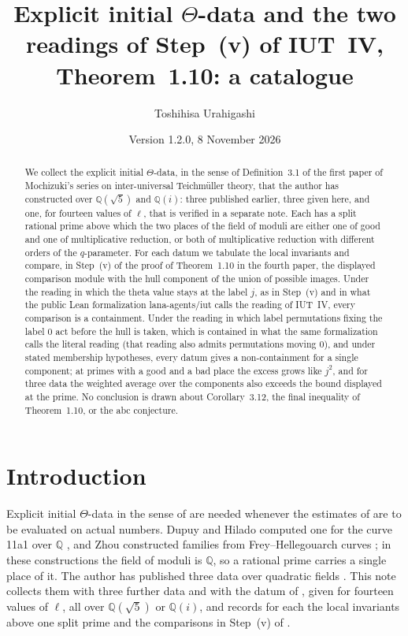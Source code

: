 \documentclass[11pt]{amsart}
\theoremstyle{remark}
\newcommand{\Q}{\mathbb Q}
\begin{document}
\title[Explicit initial $\Theta$-data and Step~(v): a catalogue]{Explicit initial $\Theta$-data and the two readings of Step~(v) of IUT~IV, Theorem~1.10: a catalogue}
\author{Toshihisa Urahigashi}
\date{Version 1.2.0, 8 November 2026}

\begin{abstract}
We collect the explicit initial $\Theta$-data, in the sense of Definition~3.1 of the first paper of Mochizuki's
series on inter-universal Teichm\"uller theory, that the author has constructed over $\Q(\sqrt5)$ and $\Q(i)$:
three published earlier, three given here, and one, for fourteen values of $\ell$, that is verified in a separate
note. Each has a split rational
prime above which the two places of the field of moduli are either one of good and one of multiplicative reduction,
or both of multiplicative reduction with different orders of the $q$-parameter. For each datum we tabulate the local
invariants and compare, in Step~(v) of the proof of Theorem~1.10 in the fourth paper, the displayed comparison module
with the hull component of the union of possible images. Under the reading in which the theta value stays at the
label $j$, as in Step~(v) and in what the public Lean formalization lana-agents/iut calls the reading of IUT~IV,
every comparison is a containment. Under the reading in which label permutations fixing the label $0$ act before
the hull is taken, which is contained in what the same formalization calls the literal reading (that reading also
admits permutations moving $0$), and under stated membership hypotheses, every datum gives a
non-containment for a single component; at primes with a good and a bad place the excess grows like $j^2$, and for
three data the weighted average over the components also exceeds the bound displayed at the prime. No conclusion is
drawn about Corollary~3.12, the final inequality of Theorem~1.10, or the abc conjecture.
\end{abstract}

\maketitle

\section{Introduction}

Explicit initial $\Theta$-data in the sense of \cite[Def.~3.1]{IUT1} are needed whenever the estimates of
\cite{IUT4} are to be evaluated on actual numbers. Dupuy and Hilado computed one for the curve 11a1 over $\Q$
\cite[\S2.10]{DH1}, and Zhou constructed families from Frey--Hellegouarch curves \cite{Zhou1,Zhou2}; in these
constructions the field of moduli is $\Q$, so a rational prime carries a single place of it. The author has published
three data over quadratic fields \cite{First,Second,Note}. This note collects them with three further data and with
the datum of \cite{Fourteen}, given for fourteen values of $\ell$, all over $\Q(\sqrt5)$ or $\Q(i)$, and records for
each the local invariants above one split prime and the comparisons in
Step~(v) of \cite[Thm.~1.10, proof]{IUT4}.
\end{document}
